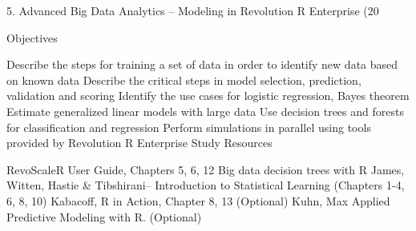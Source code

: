 5. Advanced Big Data Analytics – Modeling in Revolution R Enterprise (20%

Objectives

Describe the steps for training a set of data in order to identify new data based on known data
Describe the critical steps in model selection, prediction, validation and scoring
Identify the use cases for logistic regression, Bayes theorem
Estimate generalized linear models with large data
Use decision trees and forests for classification and regression
Perform simulations in parallel using tools provided by Revolution R Enterprise
Study Resources

RevoScaleR User Guide, Chapters 5, 6, 12
Big data decision trees with R
James, Witten, Hastie & Tibshirani– Introduction to Statistical Learning (Chapters 1-4, 6, 8, 10)
Kabacoff, R in Action, Chapter 8, 13 (Optional)
Kuhn, Max Applied Predictive Modeling with R. (Optional)
